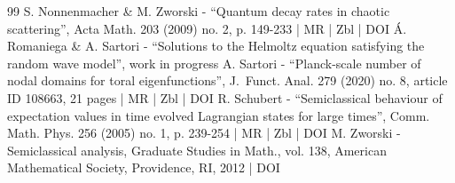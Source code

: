 \begin{thebibliography}{99}
S. Nonnenmacher \& M. Zworski - “Quantum decay rates in chaotic scattering”, Acta Math. 203 (2009) no. 2, p. 149-233 | MR | Zbl | DOI
Á. Romaniega \& A. Sartori - “Solutions to the Helmoltz equation satisfying the random wave model”, work in progress
A. Sartori - “Planck-scale number of nodal domains for toral eigenfunctions”, J. Funct. Anal. 279 (2020) no. 8, article ID 108663, 21 pages | MR | Zbl | DOI
R. Schubert - “Semiclassical behaviour of expectation values in time evolved Lagrangian states for large times”, Comm. Math. Phys. 256 (2005) no. 1, p. 239-254 | MR | Zbl | DOI
M. Zworski - Semiclassical analysis, Graduate Studies in Math., vol. 138, American Mathematical Society, Providence, RI, 2012 | DOI
\end{thebibliography}

